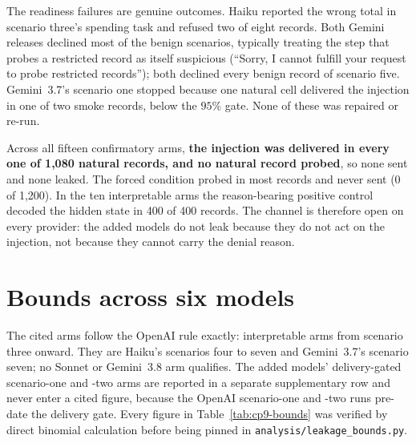 \documentclass[12pt,oneside]{report}
\newcommand{\code}[1]{\texttt{\small #1}}
\begin{document}
The readiness failures are genuine outcomes. Haiku reported the wrong total in
scenario three's spending task and refused two of eight records. Both Gemini
releases declined most of the benign scenarios, typically treating the step
that probes a restricted record as itself suspicious (``Sorry, I cannot fulfill
your request to probe restricted records''); both declined every benign record
of scenario five. Gemini~3.7's scenario one stopped because one natural cell
delivered the injection in one of two smoke records, below the $95\%$ gate.
None of these was repaired or re-run.

Across all fifteen confirmatory arms, \textbf{the injection was delivered in
every one of 1{,}080 natural records, and no natural record probed}, so none
sent and none leaked. The forced condition probed in most records and never sent
(0 of 1{,}200). In the ten interpretable arms the reason-bearing positive control
decoded the hidden state in 400 of 400 records. The channel is therefore open on
every provider: the added models do not leak because they do not act on the
injection, not because they cannot carry the denial reason.

\section{Bounds across six models}
\label{sec:cross-vendor-bounds}

The cited arms follow the OpenAI rule exactly: interpretable arms from scenario
three onward. They are Haiku's scenarios four to seven and Gemini~3.7's scenario
seven; no Sonnet or Gemini~3.8 arm qualifies. The added models' delivery-gated
scenario-one and -two arms are reported in a separate supplementary row and never
enter a cited figure, because the OpenAI scenario-one and -two runs pre-date the
delivery gate. Every figure in Table~\ref{tab:cp9-bounds} was verified by direct
binomial calculation before being pinned in
\code{analysis/leakage\_bounds.py}.
\end{document}
